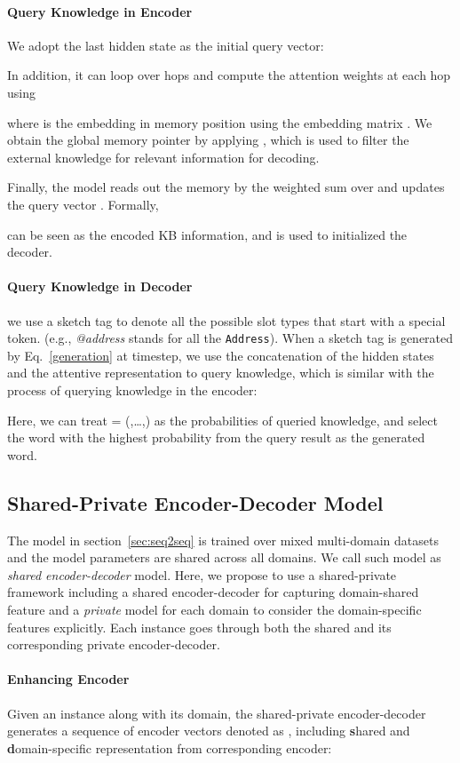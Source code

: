 \documentclass[11pt,a4paper]{article}
\begin{document}
\paragraph{Query Knowledge in Encoder} \label{encoder_query}
We adopt the last hidden state as the initial query vector:

In addition, it can loop over  hops and compute the attention weights at each hop  using

where  is the embedding in  memory position using the embedding matrix .
We obtain the global memory pointer  by applying , which is used to filter the external knowledge for relevant information for decoding.

Finally, the model reads out the memory  by the weighted sum over  and updates the query vector . Formally,


 can be seen as the encoded KB information, and is used to initialized the decoder.
\paragraph{Query Knowledge in Decoder} \label{decoder_query}
we use a sketch tag to denote all the possible slot types that start with a special token. (e.g., \textit{@address} stands for all the \texttt{Address}).
When a sketch tag is generated by Eq.~\ref{generation} at  timestep, we use the concatenation of the hidden states 
and the attentive representation  to query knowledge, which is similar with the process of querying knowledge in the encoder:


Here, we can treat  = (,\dots,) as the probabilities of queried knowledge, and select the word with the highest probability from the query result as the generated word. 

\subsection{Shared-Private Encoder-Decoder Model} \label{sec:shared-private}
The model in section~\ref{sec:seq2seq} is trained over mixed multi-domain datasets and the model parameters are shared across all domains.
We call such model as \textit{shared encoder-decoder} model.
Here, we propose to use a shared-private framework including a shared encoder-decoder for capturing domain-shared feature and a \textit{private} model for each domain to consider the domain-specific features explicitly.
Each instance  goes through both the shared and its corresponding private encoder-decoder.
\paragraph{Enhancing Encoder}
Given an instance along with its domain, the shared-private encoder-decoder generates a sequence of encoder vectors denoted as ,  including \textbf{s}hared and \textbf{d}omain-specific representation from corresponding encoder:
\end{document}

